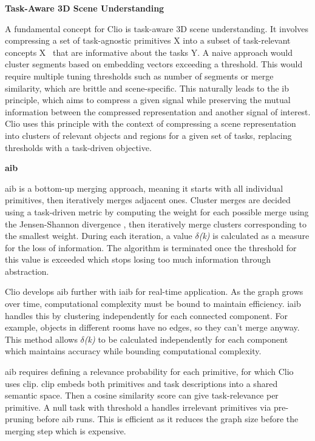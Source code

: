 \noindent \textbf{Task-Aware 3D Scene Understanding}

A fundamental concept for Clio is task-aware 3D scene understanding. It involves compressing a set of task-agnostic primitives X into a subset of task-relevant concepts X~ that are informative about the tasks Y.  A naive approach would cluster segments based on embedding vectors exceeding a threshold. This would require multiple tuning thresholds such as number of segments or merge similarity, which are brittle and scene-specific. This naturally leads to the \gls{ib} principle, which aims to compress a given signal while preserving the mutual information between the compressed representation and another signal of interest. Clio uses this principle with the context of compressing a scene representation into clusters of relevant objects and regions for a given set of tasks, replacing thresholds with a task-driven objective.

\noindent \textbf{\gls{aib}}

\gls{aib} is a bottom-up merging approach, meaning it starts with all individual primitives, then iteratively merges adjacent ones. Cluster merges are decided using a task-driven metric by computing the weight for each possible merge using the Jensen-Shannon divergence \cite{hoyososorio2024representationjensenshannondivergence}, then iteratively merge clusters corresponding to the smallest weight. During each iteration, a value $\delta$\textit{(k)} is calculated as a measure for the loss of information. The algorithm is terminated once the threshold for this value is exceeded which stops losing too much information through abstraction.

Clio develops \gls{aib} further with \gls{iaib} for real-time application. As the graph grows over time, computational complexity must be bound to maintain efficiency. \gls{iaib} handles this by clustering independently for each connected component. For example, objects in different rooms have no edges, so they can’t merge anyway. This method allows $\delta$\textit{(k)} to be calculated independently for each component which maintains accuracy while bounding computational complexity.

\gls{aib} requires defining a relevance probability for each primitive, for which Clio uses \gls{clip}. \gls{clip} embeds both primitives and task descriptions into a shared semantic space. Then a cosine similarity score can give task-relevance per primitive. A null task with threshold a handles irrelevant primitives via pre-pruning before \gls{aib} runs. This is efficient as it reduces the graph size before the merging step which is expensive.


